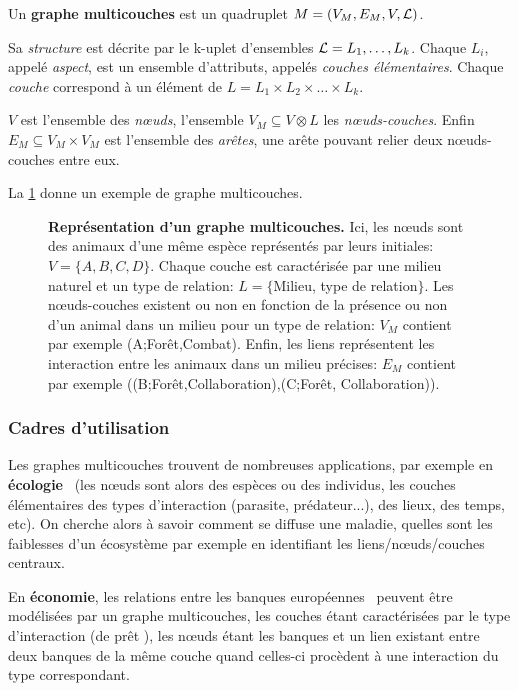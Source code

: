 \documentclass[11pt,a4paper]{article}
\theoremstyle{definition}
\theoremstyle{remark}
\theoremstyle{remark}
\begin{document}
 
 
  Un \textbf{graphe multicouches} est un quadruplet $M = (V_M, E_M, V, {\cal L})$.
  
 Sa {\em structure} est décrite par le k-uplet d'ensembles ${\cal L} = L_1, \dots , L_k$. Chaque $L_i$, appelé {\em aspect}, est un ensemble d'attributs, appelés {\em couches élémentaires}. Chaque {\em couche} correspond à un élément de $L=L_1\times L_2 \times \dots \times L_k$.\label{structure}
 
 $V$ est l'ensemble des {\em n\oe{}uds}, l'ensemble $V_M \subseteq V\otimes L$ les {\em n\oe{}uds-couches}. Enfin $E_M \subseteq V_M \times V_M $ est l'ensemble des {\em arêtes}, une arête pouvant relier deux n\oe{}uds-couches entre eux. 


 La \cref{exmulti} donne un exemple de graphe multicouches.

\begin{figure}[h]
	\centering
	
	\caption{\textbf{Représentation d'un graphe multicouches.} Ici, les n\oe{}uds sont des animaux d'une même espèce représentés par leurs initiales: $V = \{A ,B,C,D \}$. Chaque couche est caractérisée par une milieu naturel et un type de relation: $L = \{$Milieu, type de relation$\}$. Les n\oe{}uds-couches existent ou non en fonction de la présence ou non d'un animal dans un milieu pour un type de relation: $V_M$ contient par exemple (A;Forêt,Combat). Enfin, les liens représentent les interaction entre les animaux dans un milieu précises: $E_M$ contient par exemple ((B;Forêt,Collaboration),(C;Forêt, Collaboration)).}
	\label{exmulti}
\end{figure}

\subsubsection{Cadres d'utilisation}


Les graphes multicouches trouvent de nombreuses applications, par exemple en \textbf{écologie}~\cite{ecolo} (les n\oe{}uds sont alors des espèces ou des individus, les couches élémentaires des types d'interaction (parasite, prédateur...), des lieux, des temps, etc). On cherche alors à savoir comment se diffuse une maladie, quelles sont les faiblesses d'un écosystème par exemple en identifiant les liens/n\oe{}uds/couches centraux.

En \textbf{économie}, les relations entre les banques européennes~\cite{interbank} peuvent être modélisées par un graphe multicouches, les couches étant caractérisées par le type d'interaction (de \og prêt \fg{}), les n\oe{}uds étant les banques et un lien existant entre deux banques de la même couche quand celles-ci procèdent à une interaction du type correspondant.
\end{document}
